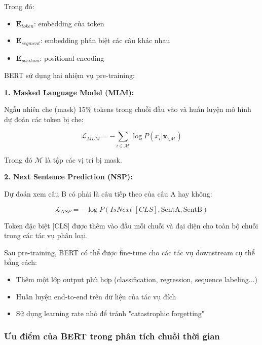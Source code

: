 Trong đó:
\begin{itemize}
    \item $\mathbf{E}_{token}$: embedding của token
    \item $\mathbf{E}_{segment}$: embedding phân biệt các câu khác nhau
    \item $\mathbf{E}_{position}$: positional encoding
\end{itemize}


BERT sử dụng hai nhiệm vụ pre-training:

\textbf{1. Masked Language Model (MLM):}

Ngẫu nhiên che (mask) 15\% tokens trong chuỗi đầu vào và huấn luyện mô hình dự đoán các token bị che:

\begin{equation}
\mathcal{L}_{MLM} = -\sum_{i \in \mathcal{M}} \log P(x_i | \mathbf{x}_{\backslash \mathcal{M}})
\end{equation}

Trong đó $\mathcal{M}$ là tập các vị trí bị mask.

\textbf{2. Next Sentence Prediction (NSP):}

Dự đoán xem câu B có phải là câu tiếp theo của câu A hay không:

\begin{equation}
\mathcal{L}_{NSP} = -\log P(IsNext | [CLS], \text{SentA}, \text{SentB})
\end{equation}

Token đặc biệt [CLS] được thêm vào đầu mỗi chuỗi và đại diện cho toàn bộ chuỗi trong các tác vụ phân loại.


Sau pre-training, BERT có thể được fine-tune cho các tác vụ downstream cụ thể bằng cách:
\begin{itemize}
    \item Thêm một lớp output phù hợp (classification, regression, sequence labeling...)
    \item Huấn luyện end-to-end trên dữ liệu của tác vụ đích
    \item Sử dụng learning rate nhỏ để tránh "catastrophic forgetting"
\end{itemize}

\subsubsection{Ưu điểm của BERT trong phân tích chuỗi thời gian}

